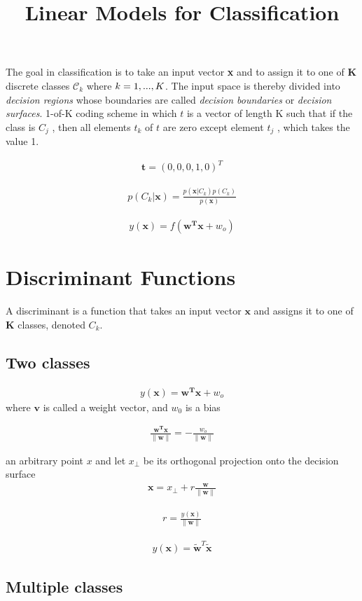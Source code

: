 \documentclass[a4paper]{article}
\begin{document}
\title{Linear Models for Classification}
\author{}
\maketitle

The goal in classification is to take an input vector \textbf{x}
 and to assign it to one of \textbf{K} discrete classes $
 \mathcal{C}_k $ where $ \mathnormal{k} = 1,...,\mathnormal{K} $.
 The input space is thereby divided into \textit{decision regions} whose
 boundaries are called \textit{decision boundaries} or
 \textit{decision surfaces}.
1-of-K coding scheme in which $t$ is a vector of length
 K such that if the class is $C_j$ , then all elements $t_k$ of $t$
 are zero except element $t_j$ , which takes the value 1.

\begin{align}
\mathbf{t} = (0,0,0,1,0)^T
\end{align}

\begin{align}
p(C_k|\mathbf{x}) = \frac { p(\mathbf{x}|C_k) p(C_k) }{p(\mathbf{x})}
\end{align}

\begin{align}
y(\mathbf{x}) = f(\mathbf{w^T}\mathbf{x} + w_o)
\end{align}


\section{Discriminant Functions}
A discriminant is a function that takes an input vector $\mathbf{x}$
 and assigns it to one of $\mathbf{K}$ classes, denoted $C_k$.

\subsection{Two classes}

\begin{align}
y(\mathbf{x}) = \mathbf{w^T}\mathbf{x} + w_o
\end{align}
where $\mathbf{v}$ is called a weight vector, and $w_0$ is a bias

\begin{align}
\frac{\mathbf{w^T}\mathbf{x}}{\|\mathbf{w}\|} = -\frac{w_o}{\|\mathbf{w}\|}
\end{align}

an arbitrary point $x$ and let $x_{\bot}$ be its orthogonal
 projection onto the decision surface
\begin{align}
\mathbf{x} = x_{\bot} + r \frac{\mathbf{w}}{\|\mathbf{w}\|}
\end{align}

\begin{align}
r = \frac{y(\mathbf{x})}{\|\mathbf{w}\|}
\end{align}

\begin{align}
y(\mathbf{x}) = \widetilde{{\mathbf{w}}}^T \widetilde{{\mathbf{x}}}
\end{align}

\subsection{Multiple classes}
\end{document}
